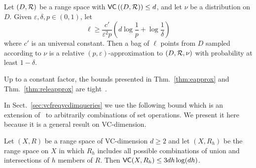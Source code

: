 \begin{theorem}\label{thm:releapprox}
  Let $(D,\mathcal{R})$ be a range space with $\mathsf{VC}\left((D,\mathcal{R})\right)\le d$, and
  let $\nu$ be a distribution on $D$. Given $\varepsilon,\delta,p\in(0,1)$, let 
  \begin{equation}\label{eq:releapprox}
    \ell\ge\frac{c'}{\varepsilon^2p}\left(d\log\frac{1}{p}+\log\frac{1}{\delta}\right)
  \end{equation}
  where $c'$ is an universal constant. Then a bag of $\ell$ points from $D$ sampled
  according to $\nu$ is a relative $(p,\varepsilon)$-approximation to
  $(D,\mathcal{R},\nu)$ with probability at least $1-\delta$.
\end{theorem}

Up to a constant factor, the bounds presented in Thm.~\ref{thm:eapprox}
and Thm.~\ref{thm:releapprox} are tight~\citep[Thm.~5]{LiLS01}. 

%


In Sect.~\ref{sec:vcfreqvcdimqueries} we use the following bound
which is an extension of~\citep[Corol.~14.4.3]{AlonS08} to arbitrarily
combinations of set operations. We present it here because it is a general
result on VC-dimension.

\begin{lemma}\label{lem:genboolcomp}
   Let $(X,R)$ be a range space of VC-dimension $d\ge 2$ and let $(X,R_h)$ be the
  range space on $X$ in which $R_h$ includes all possible combinations of 
    union and intersections of $h$ members of $R$. Then $\mathsf{VC}(X,R_h)\le
  3dh\log(dh)$.
\end{lemma}

